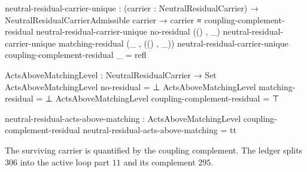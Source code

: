 \documentclass[11pt]{article}
\begin{document}
\begin{code}
neutral-residual-carrier-unique :
  (carrier : NeutralResidualCarrier) →
  NeutralResidualCarrierAdmissible carrier →
  carrier ≡ coupling-complement-residual
neutral-residual-carrier-unique no-residual (() , _)
neutral-residual-carrier-unique matching-residual (_ , (() , _))
neutral-residual-carrier-unique coupling-complement-residual _ = refl

ActsAboveMatchingLevel : NeutralResidualCarrier → Set
ActsAboveMatchingLevel no-residual                  = ⊥
ActsAboveMatchingLevel matching-residual            = ⊥
ActsAboveMatchingLevel coupling-complement-residual = ⊤

neutral-residual-acts-above-matching :
  ActsAboveMatchingLevel coupling-complement-residual
neutral-residual-acts-above-matching = tt
\end{code}

The surviving carrier is quantified by the coupling complement.  The ledger
splits $306$ into the active loop part $11$ and its complement $295$.
\end{document}
